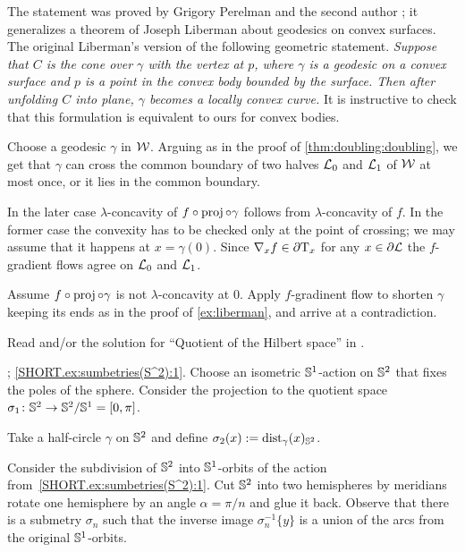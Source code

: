 The statement was proved by Grigory Perelman and the second author \cite{perelman-petrunin};
it generalizes a theorem of Joseph Liberman \cite{liberman} about geodesics on convex surfaces.
The original Liberman's version of the following geometric statement.
\textit{Suppose that $C$ is the cone over $\gamma$ with the vertex at $p$,
where $\gamma$ is a geodesic on a convex surface and $p$ is a point in the convex body bounded by the surface.
Then after unfolding $C$ into plane, $\gamma$ becomes a locally convex curve.}
It is instructive to check that this formulation is equivalent to ours for convex bodies.

Choose a geodesic $\gamma$ in $\mathcal{W}$.
Arguing as in the proof of \ref{thm:doubling:doubling}, we get 
that $\gamma$ can cross the common boundary of two halves $\mathcal{L}_0$ and $\mathcal{L}_1$ of $\mathcal{W}$ at most once, or it lies in the common boundary.

In the later case $\lambda$-concavity of $f\circ\operatorname{\rm proj}\nolimits\circ\gamma$ follows from $\lambda$-concavity of $f$.
In the former case the convexity has to be checked only at the point of crossing;
we may assume that it happens at $x=\gamma(0)$.
Since $\nabla_xf\in\partial\mathrm{T}_x$ for any $x\in\partial\mathcal{L}$ the $f$-gradient flows agree on $\mathcal{L}_0$ and $\mathcal{L}_1$.

Assume $f\circ\operatorname{\rm proj}\nolimits\circ\gamma$ is not $\lambda$-concavity at $0$.
Apply $f$-gradinent flow to shorten $\gamma$ keeping its ends as in the proof of \ref{ex:liberman},
and arrive at a contradiction.

 Read \cite[Section 4]{terng-thorbergsson} and/or the solution for ``Quotient of the Hilbert space'' in \cite{petrunin2020}.

\parbf{\ref{ex:sumbetries(S^2)}}; \ref{SHORT.ex:sumbetries(S^2):1}.
Choose an isometric $\mathbb{S}^1$-action on $\mathbb{S}^2$ that fixes the poles of the sphere.
Consider the projection to the quotient space $\sigma_1\colon\mathbb{S}^2\to \mathbb{S}^2/\mathbb{S}^1=[0,\pi]$.

Take a half-circle $\gamma$ on $\mathbb{S}^2$ and define 
$\sigma_2(x)\mathrel{:=}\mathrm{dist}_\gamma(x)_{\mathbb{S}^2}$.

Consider the subdivision of $\mathbb{S}^2$ into $\mathbb{S}^1$-orbits of the action from~\ref{SHORT.ex:sumbetries(S^2):1}.
Cut $\mathbb{S}^2$ into two hemispheres by meridians rotate one hemisphere by an angle $\alpha=\pi/n$ and glue it back.
Observe that there is a submetry $\sigma_n$ such that the inverse image $\sigma_n^{-1}\{y\}$ is a union of the arcs from the original $\mathbb{S}^1$-orbits.

